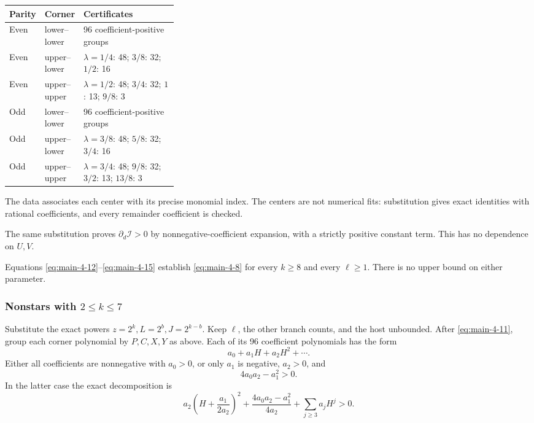 \documentclass[11pt,letterpaper]{article}
\theoremstyle{plain}
\begin{document}
\begin{center}
\begin{tabular}{@{}p{0.12\linewidth}p{0.20\linewidth}p{}@{}}
\toprule
\textbf{Parity} & \textbf{Corner} & \textbf{Certificates} \\
\midrule
Even & lower--lower & 96 coefficient-positive groups \\
Even & upper--lower & \(\lambda=1/4\): 48; \(3/8\): 32; \(1/2\): 16 \\
Even & upper--upper & \(\lambda=1/2\): 48; \(3/4\): 32; \(1\): 13; \(9/8\): 3 \\
Odd & lower--lower & 96 coefficient-positive groups \\
Odd & upper--lower & \(\lambda=3/8\): 48; \(5/8\): 32; \(3/4\): 16 \\
Odd & upper--upper & \(\lambda=3/4\): 48; \(9/8\): 32; \(3/2\): 13; \(13/8\): 3 \\
\bottomrule
\end{tabular}
\end{center}

The data associates each center with its precise monomial index. The centers are not numerical fits: substitution gives exact identities with rational coefficients, and every remainder coefficient is checked.

The same substitution proves \(\partial_d\mathcal I>0\) by nonnegative-coefficient expansion, with a strictly positive constant term. This has no dependence on \(U,V\).

Equations \eqref{eq:main-4-12}--\eqref{eq:main-4-15} establish \eqref{eq:main-4-8} for every \(k\ge8\) and every \(\ell\ge1\). There is no upper bound on either parameter.

\subsubsection*{\texorpdfstring{Nonstars with \(2\le k\le7\)}{Nonstars with 2 <= k <= 7}}\label{nonstars-with-2le-kle7}

Substitute the exact powers \(z=2^k,L=2^b,J=2^{k-b}\). Keep \(\ell\), the other branch counts, and the host unbounded. After \eqref{eq:main-4-11}, group each corner polynomial by \(P,C,X,Y\) as above. Each of its 96 coefficient polynomials has the form \[
a_0+a_1H+a_2H^2+\cdots.
\] Either all coefficients are nonnegative with \(a_0>0\), or only \(a_1\) is negative, \(a_2>0\), and \[
4a_0a_2-a_1^2>0.
\] In the latter case the exact decomposition is \[
a_2\left(H+\frac{a_1}{2a_2}\right)^2
+\frac{4a_0a_2-a_1^2}{4a_2}
+\sum_{j\ge3}a_jH^j>0.
\tag{4.17}\label{eq:main-4-17}
\]
\end{document}
